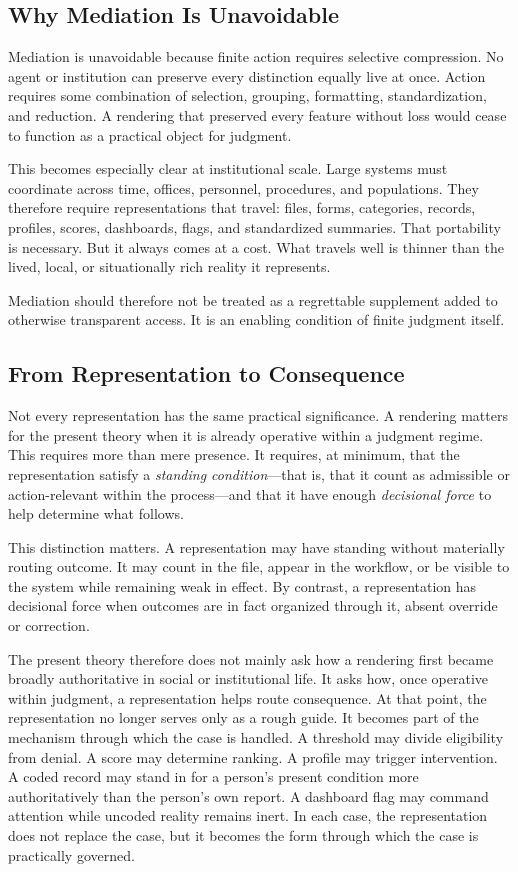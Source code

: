 \documentclass[11pt]{article}
\renewcommand{\emph}[1]{\textit{#1}}
\begin{document}
\subsection{Why Mediation Is Unavoidable}

Mediation is unavoidable because finite action requires selective compression. No agent or institution can preserve every distinction equally live at once. Action requires some combination of selection, grouping, formatting, standardization, and reduction. A rendering that preserved every feature without loss would cease to function as a practical object for judgment.

This becomes especially clear at institutional scale. Large systems must coordinate across time, offices, personnel, procedures, and populations. They therefore require representations that travel: files, forms, categories, records, profiles, scores, dashboards, flags, and standardized summaries. That portability is necessary. But it always comes at a cost. What travels well is thinner than the lived, local, or situationally rich reality it represents.

Mediation should therefore not be treated as a regrettable supplement added to otherwise transparent access. It is an enabling condition of finite judgment itself.

\subsection{From Representation to Consequence}

Not every representation has the same practical significance. A rendering matters for the present theory when it is already operative within a judgment regime. This requires more than mere presence. It requires, at minimum, that the representation satisfy a \emph{standing condition}---that is, that it count as admissible or action-relevant within the process---and that it have enough \emph{decisional force} to help determine what follows.

This distinction matters. A representation may have standing without materially routing outcome. It may count in the file, appear in the workflow, or be visible to the system while remaining weak in effect. By contrast, a representation has decisional force when outcomes are in fact organized through it, absent override or correction.

The present theory therefore does not mainly ask how a rendering first became broadly authoritative in social or institutional life. It asks how, once operative within judgment, a representation helps route consequence. At that point, the representation no longer serves only as a rough guide. It becomes part of the mechanism through which the case is handled. A threshold may divide eligibility from denial. A score may determine ranking. A profile may trigger intervention. A coded record may stand in for a person's present condition more authoritatively than the person's own report. A dashboard flag may command attention while uncoded reality remains inert. In each case, the representation does not replace the case, but it becomes the form through which the case is practically governed.
\end{document}
